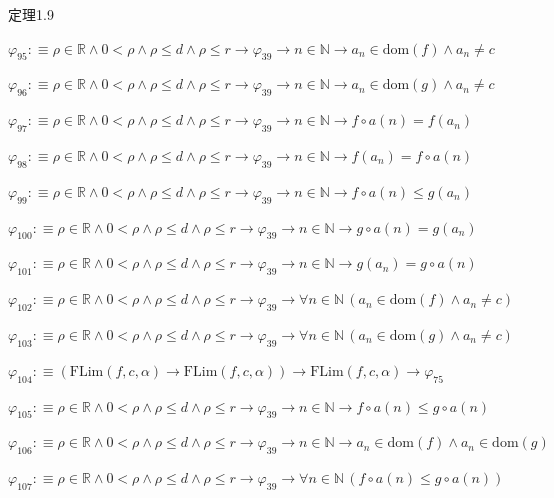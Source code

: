 \begin{fullproof}{定理1.9}
\begin{abbrevlist}
\item $\varphi_{95} :\equiv \rho \in \mathbb{R} \land 0 < \rho \land \rho \leq d \land \rho \leq r \to \varphi_{39} \to n \in \mathbb{N} \to a_{n} \in \mathrm{dom}(f) \land a_{n} \neq c$
\item $\varphi_{96} :\equiv \rho \in \mathbb{R} \land 0 < \rho \land \rho \leq d \land \rho \leq r \to \varphi_{39} \to n \in \mathbb{N} \to a_{n} \in \mathrm{dom}(g) \land a_{n} \neq c$
\item $\varphi_{97} :\equiv \rho \in \mathbb{R} \land 0 < \rho \land \rho \leq d \land \rho \leq r \to \varphi_{39} \to n \in \mathbb{N} \to f \circ a(n) = f(a_{n})$
\item $\varphi_{98} :\equiv \rho \in \mathbb{R} \land 0 < \rho \land \rho \leq d \land \rho \leq r \to \varphi_{39} \to n \in \mathbb{N} \to f(a_{n}) = f \circ a(n)$
\item $\varphi_{99} :\equiv \rho \in \mathbb{R} \land 0 < \rho \land \rho \leq d \land \rho \leq r \to \varphi_{39} \to n \in \mathbb{N} \to f \circ a(n) \leq g(a_{n})$
\item $\varphi_{100} :\equiv \rho \in \mathbb{R} \land 0 < \rho \land \rho \leq d \land \rho \leq r \to \varphi_{39} \to n \in \mathbb{N} \to g \circ a(n) = g(a_{n})$
\item $\varphi_{101} :\equiv \rho \in \mathbb{R} \land 0 < \rho \land \rho \leq d \land \rho \leq r \to \varphi_{39} \to n \in \mathbb{N} \to g(a_{n}) = g \circ a(n)$
\item $\varphi_{102} :\equiv \rho \in \mathbb{R} \land 0 < \rho \land \rho \leq d \land \rho \leq r \to \varphi_{39} \to \forall n \in \mathbb{N}\,(a_{n} \in \mathrm{dom}(f) \land a_{n} \neq c)$
\item $\varphi_{103} :\equiv \rho \in \mathbb{R} \land 0 < \rho \land \rho \leq d \land \rho \leq r \to \varphi_{39} \to \forall n \in \mathbb{N}\,(a_{n} \in \mathrm{dom}(g) \land a_{n} \neq c)$
\item $\varphi_{104} :\equiv (\mathrm{FLim}(f,c,\alpha) \to \mathrm{FLim}(f,c,\alpha)) \to \mathrm{FLim}(f,c,\alpha) \to \varphi_{75}$
\item $\varphi_{105} :\equiv \rho \in \mathbb{R} \land 0 < \rho \land \rho \leq d \land \rho \leq r \to \varphi_{39} \to n \in \mathbb{N} \to f \circ a(n) \leq g \circ a(n)$
\item $\varphi_{106} :\equiv \rho \in \mathbb{R} \land 0 < \rho \land \rho \leq d \land \rho \leq r \to \varphi_{39} \to n \in \mathbb{N} \to a_{n} \in \mathrm{dom}(f) \land a_{n} \in \mathrm{dom}(g)$
\item $\varphi_{107} :\equiv \rho \in \mathbb{R} \land 0 < \rho \land \rho \leq d \land \rho \leq r \to \varphi_{39} \to \forall n \in \mathbb{N}\,(f \circ a(n) \leq g \circ a(n))$

\end{abbrevlist}
\end{fullproof}
